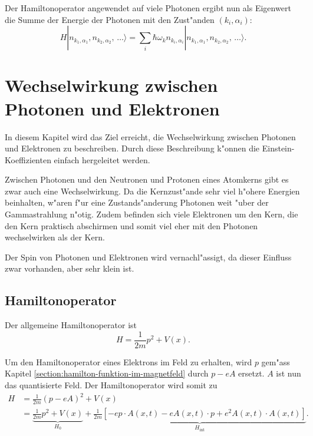 Der Hamiltonoperator angewendet auf viele Photonen ergibt nun als Eigenwert die Summe der Energie der Photonen mit den Zust"anden $(k_i,\alpha_i)$:
\begin{equation*}
H |n_{k_1,\alpha_1}, n_{k_2,\alpha_2}, \, \hdots\rangle = \sum_i \hbar \omega_k n_{k_i,\alpha_i} |n_{k_1,\alpha_1}, n_{k_2,\alpha_2}, \, \hdots\rangle.
\end{equation*}

\section{Wechselwirkung zwischen Photonen und Elektronen}

In diesem Kapitel wird das Ziel erreicht, die Wechselwirkung zwischen Photonen und Elektronen zu beschreiben. Durch diese Beschreibung k"onnen die Einstein-Koeffizienten einfach hergeleitet werden.

Zwischen Photonen und den Neutronen und Protonen eines Atomkerns gibt es zwar auch eine Wechselwirkung. Da die Kernzust"ande sehr viel h"ohere Energien beinhalten, w"aren f"ur eine Zustands"anderung Photonen weit "uber der Gammastrahlung n"otig. Zudem befinden sich viele Elektronen um den Kern, die den Kern praktisch abschirmen und somit viel eher mit den Photonen wechselwirken als der Kern.

Der Spin von Photonen und Elektronen wird vernachl"assigt, da dieser Einfluss zwar vorhanden, aber sehr klein ist.

\subsection{Hamiltonoperator}

Der allgemeine Hamiltonoperator ist
\begin{equation*}
H = \frac{1}{2m}p^2 + V(x).
\end{equation*}

Um den Hamiltonoperator eines Elektrons im Feld zu erhalten, wird $p$ gem"ass Kapitel \ref{section:hamilton-funktion-im-magnetfeld} durch $p - eA$ ersetzt. $A$ ist nun das quantisierte Feld. Der Hamiltonoperator wird somit zu
\begin{equation*}
\begin{split}
H &= \frac{1}{2m}(p - eA)^2 + V(x)\\
 &= \underbrace{\frac{1}{2m}p^2 + V(x)}_{H_0} + \underbrace{\frac{1}{2m}\left[- e p \cdot A(x, t) - e A(x, t) \cdot p + e^2 A(x, t) \cdot A(x, t) \right]}_{H_{\text{int}}}.
\end{split}
\end{equation*}

